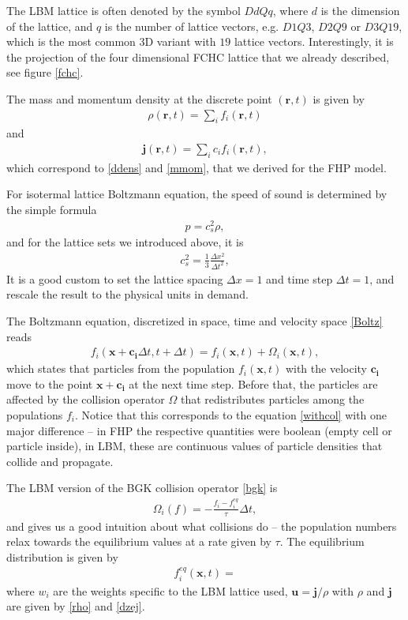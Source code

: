The LBM lattice is often denoted by the symbol $DdQq$, where $d$ is the dimension of the lattice, and $q$ is the number of lattice vectors, e.g. $D1Q3$, $D2Q9$ or $D3Q19$, which is the most common 3D variant with $19$ lattice vectors. Interestingly, it is the projection of the four dimensional FCHC lattice that we already described, see figure \ref{fchc}.

The mass and momentum density at the discrete point $(\bm{r},t)$ is given by
\begin{align} \label{rho}
\rho(\bm{r},t) = \sum_i f_i(\bm{r},t)
\end{align}
and
\begin{align} \label{dzej}
\bm{j}(\bm{r},t) = \sum_i c_i f_i(\bm{r},t),
\end{align}
which correspond to \ref{ddens} and \ref{mmom}, that we derived for the FHP model.

For isotermal lattice Boltzmann equation, the speed of sound is determined by the simple formula
\begin{align*}
p = c_s^2 \rho,
\end{align*}
and for the lattice sets we introduced above, it is
\begin{align*}
c_s^2 = \frac{1}{3} \frac{\Delta x^2}{\Delta t^2},
\end{align*}
It is a good custom to set the lattice spacing $\Delta x = 1$  and time step $\Delta t = 1$, and rescale the result to the physical units in demand.

The Boltzmann equation, discretized in space, time and velocity space \ref{Boltz} reads
\begin{align} \label{updt}
f_i(\bm{x} + \bm{c_i}\Delta t, t + \Delta t) = f_i(\bm{x},t) + \Omega_i(\bm{x},t),
\end{align}
which states that particles from the population $f_i(\bm{x},t)$ with the velocity $\bm{c_i}$ move to the point $\bm{x + c_i}$ at the next time step. Before that, the particles are affected by the collision operator $\Omega$ that redistributes particles among the populations $f_i$.
Notice that this corresponds to the equation \ref{withcol} with one major difference -- in FHP the respective quantities were boolean (empty cell or particle inside), in LBM, these are continuous values of particle densities that collide and propagate.

The LBM version of the BGK collision operator \ref{bgk} is
\begin{align*}
\Omega_i(f) = - \frac{f_i - f_i^{eq}}{\tau} \Delta t,
\end{align*}
and gives us a good intuition about what collisions do -- the population numbers relax towards the equilibrium values at a rate given by $\tau$.
The equilibrium distribution is given by
\begin{align} \label{mbcomp}
f_i^{eq}(\bm{x},t) = 
\end{align}
where $w_i$ are the weights specific to the LBM lattice used, $\bm{u} = \bm{j} / \rho$ with $\rho$ and $\bm{j}$ are given by \ref{rho} and \ref{dzej}.

